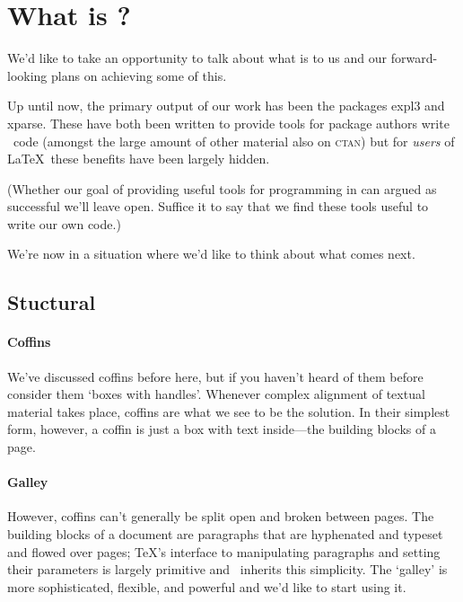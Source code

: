 \documentclass{ltnews}
\providecommand\acro[1]{\textsc{\MakeLowercase{#1}}}
\begin{document}
  \renewcommand{\LaTeXNews}{\LaTeX3~News}
  \RaggedRight
  \setlength\parindent{1.5em}

\maketitle

\section{What is \TeaTeX?}

We'd like to take an opportunity to talk about what \TeaTeX is to us and our forward-looking plans on achieving some of this.

Up until now, the primary output of our \TeaTeX work has been the packages \textsf{expl3} and \textsf{xparse}.
These have both been written to provide tools for package authors write \LaTeXe\ code (amongst the large amount of other material also on \acro{CTAN}) but for \emph{users} of \LaTeX\ these benefits have been largely hidden.

(Whether our goal of providing useful tools for programming in can argued as successful we'll leave open.
Suffice it to say that we find these tools useful to write our own code.)

We're now in a situation where we'd like to think about what comes next.

\subsection{Stuctural}

\paragraph{Coffins}

We've discussed coffins before here, but if you haven't heard of them before consider them `boxes with handles'.
Whenever complex alignment of textual material takes place, coffins are what we see to be the solution.
In their simplest form, however, a coffin is just a box with text inside---the building blocks of a page.

\paragraph{Galley}

However, coffins can't generally be split open and broken between pages. The building blocks of a document are paragraphs that are hyphenated and typeset and flowed over pages; \TeX's interface to manipulating paragraphs and setting their parameters is largely primitive and \LaTeXe\ inherits this simplicity.
The \TeaTeX `galley' is more sophisticated, flexible, and powerful and we'd like to start using it.
\end{document}
